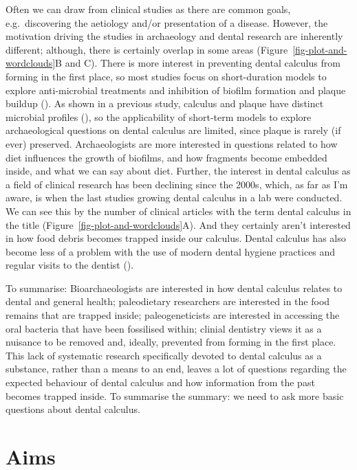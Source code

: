 \documentclass[
  b5paper,
]{book}
\begin{document}
Often we can draw from clinical studies as there are common goals,
e.g.~discovering the aetiology and/or presentation of a disease.
However, the motivation driving the studies in archaeology and dental
research are inherently different; although, there is certainly overlap
in some areas (Figure~\ref{fig-plot-and-wordclouds}B and C). There is
more interest in preventing dental calculus from forming in the first
place, so most studies focus on short-duration models to explore
anti-microbial treatments and inhibition of biofilm formation and plaque
buildup (). As
shown in a previous study, calculus and plaque have distinct microbial
profiles (), so the applicability of short-term models to explore
archaeological questions on dental calculus are limited, since plaque is
rarely (if ever) preserved. Archaeologists are more interested in
questions related to how diet influences the growth of biofilms, and how
fragments become embedded inside, and what we can say about diet.
Further, the interest in dental calculus as a field of clinical research
has been declining since the 2000s, which, as far as I'm aware, is when
the last studies growing dental calculus in a lab were conducted. We can
see this by the number of clinical articles with the term dental
calculus in the title (Figure~\ref{fig-plot-and-wordclouds}A). And they
certainly aren't interested in how food debris becomes trapped inside
our calculus. Dental calculus has also become less of a problem with the
use of modern dental hygiene practices and regular visits to the dentist
().

To summarise: Bioarchaeologists are interested in how dental calculus
relates to dental and general health; paleodietary researchers are
interested in the food remains that are trapped inside; paleogeneticists
are interested in accessing the oral bacteria that have been fossilised
within; clinial dentistry views it as a nuisance to be removed and,
ideally, prevented from forming in the first place. This lack of
systematic research specifically devoted to dental calculus as a
substance, rather than a means to an end, leaves a lot of questions
regarding the expected behaviour of dental calculus and how information
from the past becomes trapped inside. To summarise the summary: we need
to ask more basic questions about dental calculus.

\section{Aims}\label{intro-aims}
\end{document}
